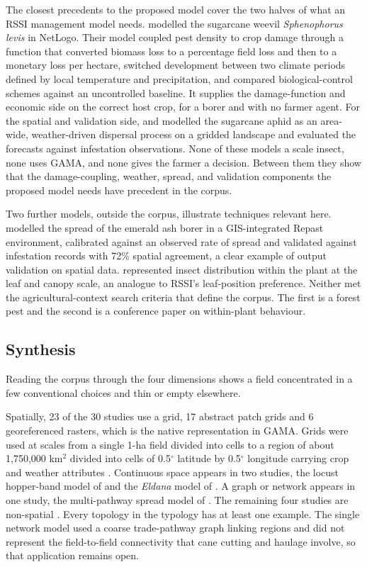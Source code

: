 The closest precedents to the proposed model cover the two halves of what an RSSI management model needs. \citet{Alves2026} modelled the sugarcane weevil \emph{Sphenophorus levis} in NetLogo. Their model coupled pest density to crop damage through a function that converted biomass loss to a percentage field loss and then to a monetary loss per hectare, switched development between two climate periods defined by local temperature and precipitation, and compared biological-control schemes against an uncontrolled baseline. It supplies the damage-function and economic side on the correct host crop, for a borer and with no farmer agent. For the spatial and validation side, \citet{Koralewski2022} and \citet{Wang2019} modelled the sugarcane aphid as an area-wide, weather-driven dispersal process on a gridded landscape and evaluated the forecasts against infestation observations. None of these models a scale insect, none uses GAMA, and none gives the farmer a decision. Between them they show that the damage-coupling, weather, spread, and validation components the proposed model needs have precedent in the corpus.

Two further models, outside the corpus, illustrate techniques relevant here. \citet{Anderson2015} modelled the spread of the emerald ash borer in a GIS-integrated Repast environment, calibrated against an observed rate of spread and validated against infestation records with 72\% spatial agreement, a clear example of output validation on spatial data. \citet{Wang2015} represented insect distribution within the plant at the leaf and canopy scale, an analogue to RSSI's leaf-position preference. Neither met the agricultural-context search criteria that define the corpus. The first is a forest pest and the second is a conference paper on within-plant behaviour.

\subsection{Synthesis}

Reading the corpus through the four dimensions shows a field concentrated in a few conventional choices and thin or empty elsewhere.

Spatially, 23 of the 30 studies use a grid, 17 abstract patch grids and 6 georeferenced rasters, which is the native representation in GAMA. Grids were used at scales from a single 1-ha field divided into cells \citep{Alves2024} to a region of about 1,750,000 km$^2$ divided into cells of 0.5$^{\circ}$ latitude by 0.5$^{\circ}$ longitude carrying crop and weather attributes \citep{Wang2019}. Continuous space appears in two studies, the locust hopper-band model of \citet{Bernoff2020} and the \emph{Eldana} model of \citet{vanVuuren2018}. A graph or network appears in one study, the multi-pathway spread model of \citet{McNitt2019}. The remaining four studies are non-spatial \citep{Grovermann2017,Gergs2026,Herbillon2024,Chen2024}. Every topology in the typology has at least one example. The single network model used a coarse trade-pathway graph linking regions and did not represent the field-to-field connectivity that cane cutting and haulage involve, so that application remains open.

